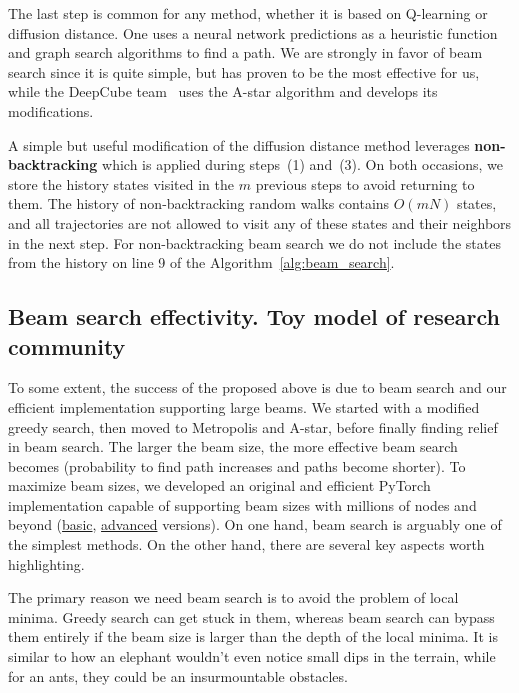 \documentclass[reqno,11pt]{amsart}
\begin{document}
The last step is common for any method, whether it is based on Q-learning or diffusion distance. One uses a neural network predictions as a heuristic function and graph search algorithms to find a path. We are strongly in favor of beam search since it is quite simple, but has proven to be the most effective for us, while the DeepCube team~\cite{mcaleer2019solving, agostinelli2019solving, khandelwal2024towards,agostinelli2024q} uses the A-star algorithm and develops its modifications.

A simple but useful modification of the diffusion distance method leverages \textbf{non-backtracking} which is applied during steps~(1) and~(3). On both occasions, we store the history states visited in the $m$ previous steps to avoid returning to them. The history of non-backtracking random walks contains $O(mN)$ states, and all trajectories are not allowed to visit any of these states and their neighbors in the next step. For non-backtracking beam search we do not include the states from the history on line 9 of the Algorithm~\ref{alg:beam_search}.

\subsection{Beam search effectivity. Toy model of research community }\label{sec-Beam}

To some extent, the success of the proposed above is due to beam search and our efficient implementation supporting large beams. We started with a modified greedy search, then moved to Metropolis and A-star, before finally finding relief in beam search. The larger the beam size, the more effective beam search becomes (probability to find path increases and paths become shorter). To maximize beam sizes, we developed an original and efficient PyTorch implementation capable of supporting beam sizes with millions of nodes and beyond (\href{https://www.kaggle.com/code/alexandervc/beamsearch-basic}{basic}, \href{https://github.com/iKolt/cayleypy/blob/main/cayleypy/cayley_graph.py#L447}{advanced} versions). On one hand, beam search is arguably one of the simplest methods. On the other hand, there are several key aspects worth highlighting.

The primary reason we need beam search is to avoid the problem of local minima. Greedy search can get stuck in them, whereas beam search can bypass them entirely if the beam size is larger than the depth of the local minima. It is similar to how an elephant wouldn't even notice small dips in the terrain, while for an ants, they could be an insurmountable obstacles.
\end{document}
